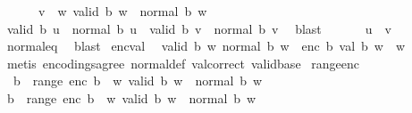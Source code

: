 \begin{isabellebody}
\ \ \ \ \ \ {\isachardoublequoteopen}v\ {\isasymin}\ {\isacharbraceleft}{\kern0pt}w{\isachardot}{\kern0pt}\ valid\ b\ w\ {\isasymand}\ normal\ b\ w{\isacharbraceright}{\kern0pt}{\isachardoublequoteclose}\isanewline
\ \ \isamarkupfalse%
\ {\isachardoublequoteopen}valid\ b\ u\ {\isasymand}\ normal\ b\ u\ {\isasymand}\ valid\ b\ v\ {\isasymand}\ normal\ b\ v{\isachardoublequoteclose}\ \isamarkupfalse%
\ blast\isanewline
\ \ \isamarkupfalse%
\ {\isachardoublequoteopen}{}{\isachardoublequoteclose}\ \isamarkupfalse%
\ {\isachardoublequoteopen}u\ {\isacharequal}{\kern0pt}\ v{\isachardoublequoteclose}\ \isamarkupfalse%
\ normal{\isacharunderscore}{\kern0pt}eq\ \isamarkupfalse%
\ blast\isanewline
{}\isamarkupfalse%
%
\endisatagproof
{\isafoldproof}%
%
\isadelimproof
\isanewline
%
\endisadelimproof
\isanewline
{}\isamarkupfalse%
\ enc{\isacharunderscore}{\kern0pt}val{\isacharcolon}{\kern0pt}\isanewline
\ \ {\isachardoublequoteopen}{\isasymlbrakk}valid\ b\ w{\isacharsemicolon}{\kern0pt}\ normal\ b\ w{\isasymrbrakk}\ {\isasymLongrightarrow}\ enc\ b\ {\isacharparenleft}{\kern0pt}val\ b\ w{\isacharparenright}{\kern0pt}\ {\isacharequal}{\kern0pt}\ w{\isachardoublequoteclose}\isanewline
%
\isadelimproof
\ \ %
\endisadelimproof
%
\isatagproof
{}\isamarkupfalse%
\ {\isacharparenleft}{\kern0pt}metis\ encodings{\isacharunderscore}{\kern0pt}agree\ normal{\isacharunderscore}{\kern0pt}def\ val{\isacharunderscore}{\kern0pt}correct\ valid{\isacharunderscore}{\kern0pt}base{\isacharparenright}{\kern0pt}%
\endisatagproof
{\isafoldproof}%
%
\isadelimproof
\isanewline
%
\endisadelimproof
\isanewline
{}\isamarkupfalse%
\ range{\isacharunderscore}{\kern0pt}enc{\isacharcolon}{\kern0pt}\isanewline
\ \ {\isachardoublequoteopen}{}{\isasymle}b\ {\isasymLongrightarrow}\ range\ {\isacharparenleft}{\kern0pt}enc\ b{\isacharparenright}{\kern0pt}\ {\isacharequal}{\kern0pt}\ {\isacharbraceleft}{\kern0pt}w{\isachardot}{\kern0pt}\ valid\ b\ w\ {\isasymand}\ normal\ b\ w{\isacharbraceright}{\kern0pt}{\isachardoublequoteclose}\isanewline
%
\isadelimproof
%
\endisadelimproof
%
\isatagproof
{}\isamarkupfalse%
\isanewline
\ \ \isamarkupfalse%
\ {\isachardoublequoteopen}{}{\isasymle}b\ {\isasymLongrightarrow}\ range\ {\isacharparenleft}{\kern0pt}enc\ b{\isacharparenright}{\kern0pt}\ {\isasymsubseteq}\ {\isacharbraceleft}{\kern0pt}w{\isachardot}{\kern0pt}\ valid\ b\ w\ {\isasymand}\ normal\ b\ w{\isacharbraceright}{\kern0pt}{\isachardoublequoteclose}\isanewline

\end{isabellebody}
